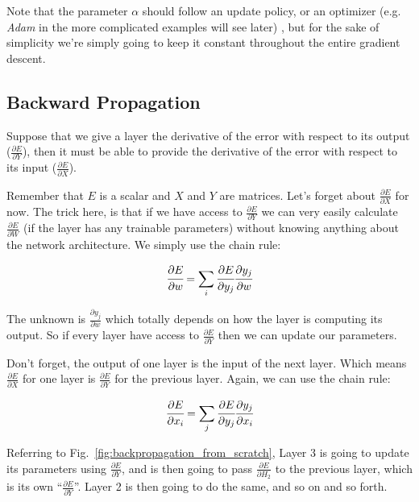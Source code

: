 Note that the parameter $\alpha$ should follow an update policy, or an optimizer (e.g. \emph{Adam} in the more complicated examples will see later) , but for the sake of simplicity we’re simply going to keep it constant throughout the entire gradient descent.

\subsection{Backward Propagation}

Suppose that we give a layer the derivative of the error with respect to its output ($\frac{\partial E}{\partial Y}$), then it must be able to provide the derivative of the error with respect to its input ($\frac{\partial E}{\partial X}$).

Remember that $E$ is a scalar and $X$ and $Y$ are matrices.
Let’s forget about $\frac{\partial E}{\partial X}$ for now. The trick here, is that if we have access to $\frac{\partial E}{\partial Y}$ we can very easily calculate $\frac{\partial E}{\partial W}$ (if the layer has any trainable parameters) without knowing anything about the network architecture. We simply use the chain rule:

\begin{equation}
	\cfrac{\partial E}{\partial w} = \sum_i \cfrac{\partial E}{\partial y_j}\cfrac{\partial y_j}{\partial w}
\end{equation}

The unknown is $\frac{\partial y_j}{\partial w}$ which totally depends on how the layer is computing its output. So if every layer have access to $\frac{\partial E}{\partial Y}$ then we can update our parameters.

Don’t forget, the output of one layer is the input of the next layer. Which means $\frac{\partial E}{\partial X}$ for one layer is $\frac{\partial E}{\partial Y}$ for the previous layer. Again, we can use the chain rule:

\begin{equation}
	\cfrac{\partial E}{\partial x_i} = \sum_j \cfrac{\partial E}{\partial y_j}\cfrac{\partial y_j}{\partial x_i}
\end{equation}

Referring to Fig.~\ref{fig:backpropagation_from_scratch}, 
Layer 3 is going to update its parameters using $\frac{\partial E}{\partial Y}$, and is then going to pass $\frac{\partial E}{\partial H_2}$ to the previous layer, which is its own “$\frac{\partial E}{\partial Y}$”. Layer 2 is then going to do the same, and so on and so forth.

